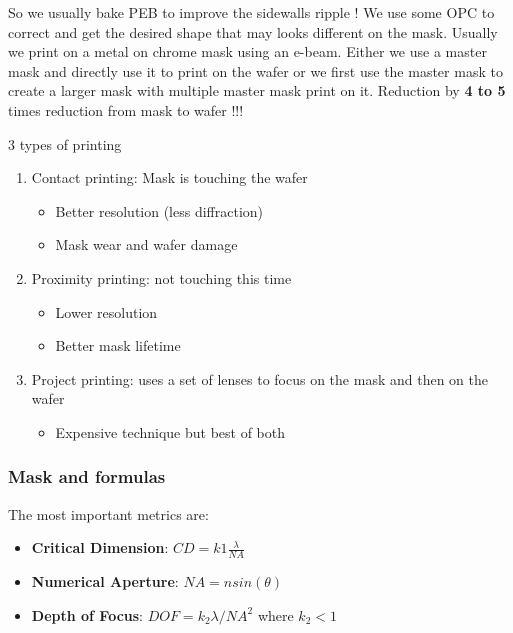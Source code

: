 \documentclass[
]{article}
\providecommand{\tightlist}{%
  \setlength{\itemsep}{0pt}\setlength{\parskip}{0pt}}
\begin{document}
So we usually bake PEB to improve the sidewalls ripple ! We use some OPC
to correct and get the desired shape that may looks different on the
mask. Usually we print on a metal on chrome mask using an e-beam. Either
we use a master mask and directly use it to print on the wafer or we
first use the master mask to create a larger mask with multiple master
mask print on it. Reduction by \textbf{4 to 5} times reduction from mask
to wafer !!!

3 types of printing

\begin{enumerate}
\def\labelenumi{\arabic{enumi}.}
\tightlist
\item
  Contact printing: Mask is touching the wafer

  \begin{itemize}
  \tightlist
  \item
    Better resolution (less diffraction)
  \item
    Mask wear and wafer damage
  \end{itemize}
\item
  Proximity printing: not touching this time

  \begin{itemize}
  \tightlist
  \item
    Lower resolution
  \item
    Better mask lifetime
  \end{itemize}
\item
  Project printing: uses a set of lenses to focus on the mask and then
  on the wafer

  \begin{itemize}
  \tightlist
  \item
    Expensive technique but best of both
  \end{itemize}
\end{enumerate}

\subsubsection{Mask and formulas}\label{mask-and-formulas}

The most important metrics are:

\begin{itemize}
\tightlist
\item
  \textbf{Critical Dimension}: \(CD = k1 \frac{\lambda}{NA}\)
\item
  \textbf{Numerical Aperture}: \(NA = n sin(\theta)\)
\item
  \textbf{Depth of Focus}: \(DOF = k_2 \lambda/NA^2\) where \(k_2 < 1\)
\end{itemize}
\end{document}
